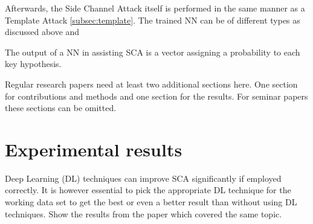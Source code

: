 \documentclass[journal]{IEEEtran}
\begin{document}
Afterwards, the Side Channel Attack itself is performed in the same manner as a Template Attack \autoref{subsec:template}. The trained NN can be of different types as discussed above and 

The output of a NN in assisting SCA is a vector assigning a probability to each key hypothesis. 



Regular research papers need at least two additional sections here. One section
for contributions and methods and one section for the results. For seminar
papers these sections can be omitted. 

\section{Experimental results}
Deep Learning (DL) techniques can improve SCA significantly if employed correctly. It is however essential to pick the appropriate DL technique for the working data set to get the best or even a better result than without using DL techniques.
Show the results from the paper which covered the same topic.

%
%

%
%
\end{document}
